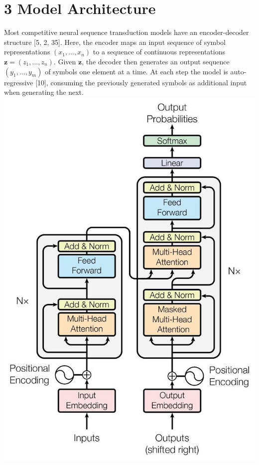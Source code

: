 \documentclass[10pt]{article}
\begin{document}
\section*{3 Model Architecture}
Most competitive neural sequence transduction models have an encoder-decoder structure [5, 2, 35]. Here, the encoder maps an input sequence of symbol representations $\left(x_{1}, \ldots, x_{n}\right)$ to a sequence of continuous representations $\mathbf{z}=\left(z_{1}, \ldots, z_{n}\right)$. Given $\mathbf{z}$, the decoder then generates an output sequence $\left(y_{1}, \ldots, y_{m}\right)$ of symbols one element at a time. At each step the model is auto-regressive [10], consuming the previously generated symbols as additional input when generating the next.\\
\includegraphics[max width=\textwidth, center]{2024_11_26_7ad1d7977194ba7a884dg-03}
\end{document}
